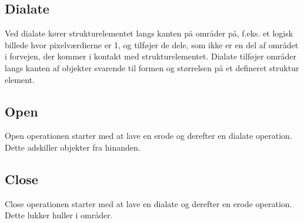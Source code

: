 \subsection{Dialate}
Ved dialate kører strukturelementet langs kanten på områder på, f.eks. et logisk billede hvor pixelværdierne er 1, og tilføjer de dele, som ikke er en del af området i forvejen, der kommer i kontakt med strukturelementet.
Dialate tilføjer områder langs kanten af objekter svarende til formen og størrelsen på et defineret struktur element.

\newpage
\subsection{Open}
Open operationen starter med at lave en erode og derefter en dialate operation.
Dette adskiller objekter fra hinanden.

\subsection{Close}
Close operationen starter med at lave en dialate og derefter en erode operation.
Dette lukker huller i områder.







